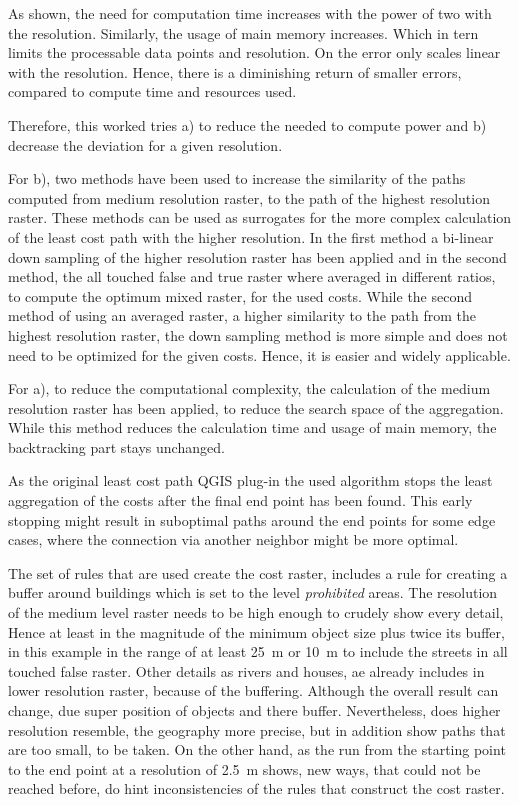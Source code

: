 As shown, the need for computation time increases with the power of two with the resolution. 
Similarly, the usage of main memory increases. 
Which in tern limits the processable data points and resolution.
On the error only scales linear with the resolution. 
Hence, there is a diminishing return of smaller errors, compared to compute time and resources used.

Therefore, this worked tries a) to reduce the needed to compute power and b) decrease the deviation for a given resolution.

For b), two methods have been used to increase the similarity of the paths computed from medium resolution raster, to the path of the highest resolution raster.
These methods can be used as surrogates for the more complex calculation of the least cost path with the higher resolution.
In the first method a bi-linear down sampling of the higher resolution raster has been applied and in the second method, the all touched false and true raster where averaged in different ratios, to compute the optimum mixed raster, for the used costs.
While the second method of using an averaged raster, a higher similarity to the path from the highest resolution raster, the down sampling method is more
simple and does not need to be optimized for the given costs.
Hence, it is easier and widely applicable.

For a), to reduce the computational complexity, the calculation of the medium resolution raster has been applied, to reduce the search space of the aggregation.
While this method reduces the calculation time and usage of main memory, the backtracking part stays unchanged.



As the original least cost path QGIS plug-in the used algorithm stops the least aggregation of the costs after the final end point has been found.
This early stopping might result in suboptimal paths around the end points for some edge cases, where the connection via another neighbor might be more optimal.

The set of rules that are used create the cost raster, includes a rule for creating a buffer around buildings  which is set to the level \textit{prohibited} areas.
The resolution of the medium level raster needs to be high enough to crudely show every detail, Hence at least in the magnitude of the minimum object size plus twice its buffer, in this example in the range of at least 25~m or 10~m to include the streets in all touched false raster.
Other details as rivers and houses, ae already includes in lower resolution raster, because of the buffering.
Although the overall result can change, due super position of objects and there buffer.
Nevertheless, does higher resolution resemble, the geography more precise, but in addition show paths that are too small, to be taken.
On the other hand, as the run from the starting point to the end point at a resolution of 2.5~m shows, new ways, that could not be reached before, do hint inconsistencies of the rules that construct the cost raster.


